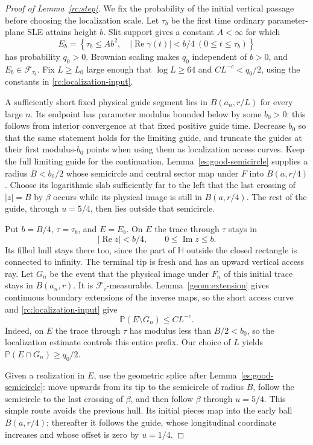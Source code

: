 \documentclass[11pt]{article}
\theoremstyle{definition}
\theoremstyle{remark}
\numberwithin{equation}{section}
\begin{document}
\begin{proof}[Proof of Lemma~\ref{rc:step}]
We fix the probability of the initial vertical passage before choosing
the localization scale. Let $\tau_b$ be the first time ordinary
parameter-plane SLE attains height $b$. Slit support gives a constant
$A<\infty$ for which
\[
 E_b=\left\{\tau_b\le Ab^2,\quad
       |\operatorname{Re}\gamma(t)|<b/4\ (0\le t\le\tau_b)\right\}
\]
has probability $q_0>0$. Brownian scaling makes $q_0$ independent of
$b>0$, and $E_b\in\mathcal F_{\tau_b}$. Fix $L\ge L_0$ large enough that
$\log L\ge64$ and $CL^{-c}<q_0/2$, using the constants in
\eqref{rc:localization-input}.

A sufficiently short fixed physical guide segment lies in
$B(a_n,r/L)$ for every large $n$. Its endpoint has parameter modulus
bounded below by some $b_0>0$: this follows from interior convergence
at that fixed positive guide time. Decrease $b_0$ so that the same
statement holds for the limiting guide, and truncate the guides at
their first modulus-$b_0$ points when using them as localization
access curves. Keep the full limiting guide for the continuation.
Lemma~\ref{es:good-semicircle}
supplies a radius $B<b_0/2$ whose semicircle and central sector map
under $F$ into $B(a,r/4)$. Choose its logarithmic slab sufficiently
far to the left that the last crossing of $|z|=B$ by $\beta$ occurs
while its physical image is still in $B(a,r/4)$. The rest of the guide,
through $u=5/4$, then lies outside that semicircle.

Put $b=B/4$, $\tau=\tau_b$, and $E=E_b$. On $E$ the trace through
$\tau$ stays in
\[
 |\operatorname{Re}z|<b/4,\qquad 0\le\operatorname{Im}z\le b.
\]
Its filled hull stays there too, since the part of $\mathbb H$ outside
the closed rectangle is connected to infinity. The terminal tip is fresh
and has an upward vertical access ray. Let $G_n$ be the event that the
physical image under $F_n$ of this initial trace stays in $B(a_n,r)$.
It is $\mathcal F_\tau$-measurable. Lemma~\ref{geom:extension} gives
continuous boundary extensions of the inverse maps, so the short access
curve and \eqref{rc:localization-input} give
\[
 \mathbb P(E\setminus G_n)\le CL^{-c}.
\]
Indeed, on $E$ the trace through $\tau$ has modulus less than
$B/2<b_0$, so the localization estimate controls this entire prefix.
Our choice of $L$ yields $\mathbb P(E\cap G_n)\ge q_0/2$.

Given a realization in $E$, use the geometric splice after
Lemma~\ref{es:good-semicircle}: move upwards from its tip to the
semicircle of radius $B$, follow the semicircle to the last crossing
of $\beta$, and then follow $\beta$ through $u=5/4$. This simple route
avoids the previous hull. Its initial pieces map into the early ball
$B(a,r/4)$; thereafter it follows the guide, whose longitudinal
coordinate increases and whose offset is zero by $u=1/4$.


\end{proof}
\end{document}
